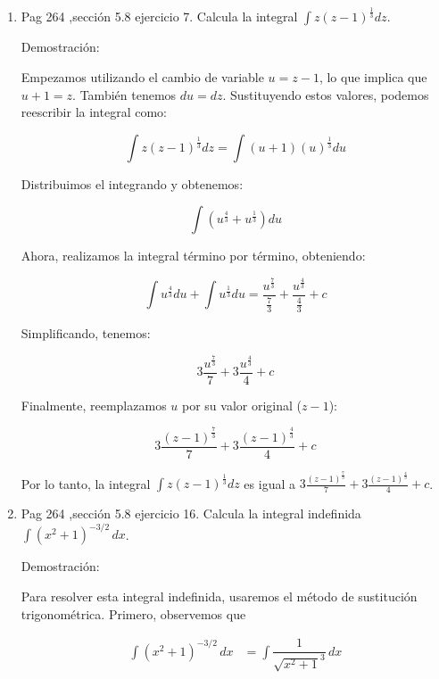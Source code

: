 \documentclass{report}
\begin{document}
\begin{enumerate}
        
        \item Pag 264 ,sección 5.8 ejercicio 7. Calcula la integral $\int z(z - 1)^{\frac{1}{3}} dz$.
        
        Demostración:
        
        Empezamos utilizando el cambio de variable $u = z - 1$, lo que implica que $u + 1 = z$. También tenemos $du = dz$. Sustituyendo estos valores, podemos reescribir la integral como:
        
        $$
        \int z(z - 1)^{\frac{1}{3}} dz = \int (u + 1)(u)^{\frac{1}{3}} du
        $$
        
        Distribuimos el integrando y obtenemos:
        
        $$
        \int (u^{\frac{4}{3}} + u^{\frac{1}{3}}) du
        $$
        
        Ahora, realizamos la integral término por término, obteniendo:
        
        $$
        \int u^{\frac{4}{3}} du + \int u^{\frac{1}{3}} du = \frac{u^{\frac{7}{3}}}{\frac{7}{3}} + \frac{u^{\frac{4}{3}}}{\frac{4}{3}} + c
        $$
        
        Simplificando, tenemos:
        
        $$
        3 \frac{u^{\frac{7}{3}}}{7} + 3 \frac{u^{\frac{4}{3}}}{4} + c
        $$
        
        Finalmente, reemplazamos $u$ por su valor original ($z - 1$):
        
        $$
        3 \frac{(z - 1)^{\frac{7}{3}}}{7} + 3 \frac{(z - 1)^{\frac{4}{3}}}{4} + c
        $$
        
        Por lo tanto, la integral $\int z(z - 1)^{\frac{1}{3}} dz$ es igual a $3 \frac{(z - 1)^{\frac{7}{3}}}{7} + 3 \frac{(z - 1)^{\frac{4}{3}}}{4} + c$.
        
        \item Pag 264 ,sección 5.8 ejercicio 16. Calcula la integral indefinida $\int \left(x^{2}+1\right)^{-3 / 2} \, dx$.
        
        Demostración:
        
        Para resolver esta integral indefinida, usaremos el método de sustitución trigonométrica. Primero, observemos que 
        
        \begin{align*}
            \int\left(x^{2}+1\right)^{-3 / 2} \, dx &= \int \dfrac{1}{\sqrt{x^2+1}^3}\,dx\\
        \end{align*}
        

\end{enumerate}
\end{document}

